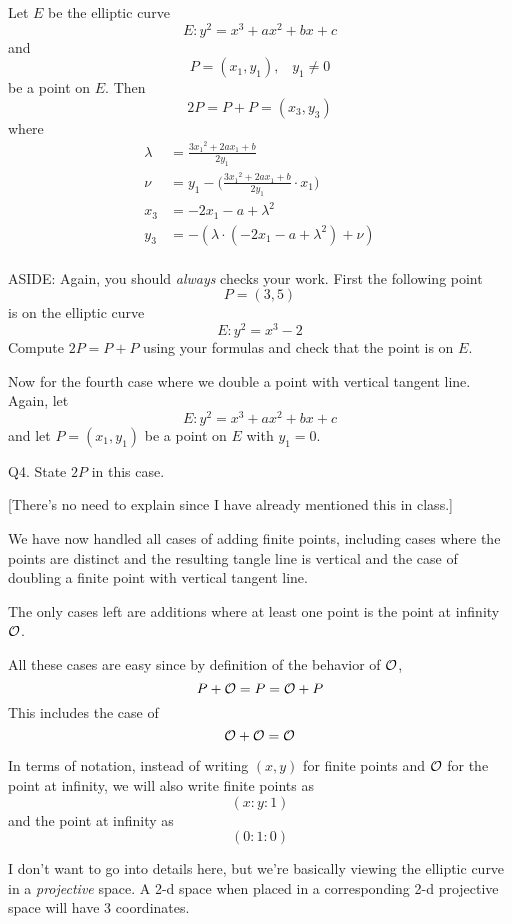 \documentclass[a4paper,12pt]{article}
\begin{document}
Let $E$ be the elliptic curve
\[
E: y^2 = x^3 + ax^2 + bx + c
\]
and 
\[
P = (x_1, y_1), \,\,\,\,\, y_1 \neq 0
\]
be a point on $E$.
Then 
\[
2P = P + P = (x_3, y_3)
\]
where
\begin{align*}
\lambda &= \frac{3{x_1}^2 + 2 a x_1 + b}{2 y_1}  \\
\nu &= y_1 - \biggr( \frac{3{x_1}^2 + 2 a x_1 + b}{2 y_1} \cdot x_1 \biggl) \\
x_3 &= -2x_1 - a + {\lambda}^2 \\
y_3 &= -(\lambda \cdot (-2x_1 - a + {\lambda}^2) + \nu) \\
\end{align*}

\newpage

ASIDE: 
Again, you should {\it always} checks your work.
First the following point
\[
P = (3, 5)
\]
is on the elliptic curve
\[
E: y^2 = x^3 - 2
\]
Compute $2P = P + P$ using your formulas and check that the point 
is on $E$.

\newpage

Now for the fourth case where we double a point with vertical
tangent line.
Again, let 
\[
E: y^2 = x^3 + ax^2 + bx + c
\]
and
let $P = (x_1, y_1)$ be a point on $E$ with $y_1 = 0$.

Q4. State $2P$ in this case.

[There's no need to explain since I have already mentioned this in class.]

\SOLUTION



\newpage

We have now handled all cases of adding finite points, including
cases where the points are distinct and the resulting tangle line is vertical
and the case of doubling a finite point with vertical tangent line.

The only cases left are additions where at least one point is the 
point at infinity ${\cal O}$.

All these cases are easy since by definition of the behavior of ${\cal O}$,
\[
P + {\cal O} = P = {\cal O} + P
\]
This includes the case of 
\[
{\cal O} + {\cal O} = {\cal O}\]

In terms of notation, instead of writing $(x,y)$ for finite points
and ${\cal O}$ for the point at infinity, 
we will also write finite points as
\[
(x:y:1)
\]
and the point at infinity as 
\[
(0:1:0)
\]

I don't want to go into details here, but we're basically viewing the
elliptic curve in a {\it projective} space. 
A 2-d space when placed in a corresponding 2-d projective space will
have 3 coordinates.
\end{document}
